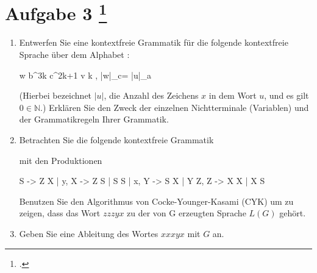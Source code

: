 \documentclass{lehramt-informatik-aufgabe}
\begin{document}
\let\m=\liMenge

\section{Aufgabe 3
\footcite{66115:2018:09}}

\begin{enumerate}


\item Entwerfen Sie eine kontextfreie Grammatik für die folgende
kontextfreie Sprache über dem Alphabet :

\begin{center}
\liAusdruck
  {w b^{3k} c^{2k+1} v}
  {k \in {}, |w|_c= |u|_a}
\end{center}

(Hierbei bezeichnet $|u|$, die Anzahl des Zeichens $x$ in dem Wort $u$,
und es gilt $0 \in \mathbb{N}$.) Erklären Sie den Zweck der einzelnen
Nichtterminale (Variablen) und der Grammatikregeln Ihrer Grammatik.


\item Betrachten Sie die folgende kontextfreie Grammatik

\begin{center}
\end{center}

mit den Produktionen

\begin{liProduktionsRegeln}
S -> Z X | y,
X -> Z S | S S | x,
Y -> S X | Y Z,
Z -> X X | X S
\end{liProduktionsRegeln}

Benutzen Sie den Algorithmus von Cocke-Younger-Kasami (CYK) um zu
zeigen, dass das Wort $zzzyx$ zu der von G erzeugten Sprache $L(G)$
gehört.


\item Geben Sie eine Ableitung des Wortes $xxxyx$ mit $G$ an.

\end{enumerate}
\end{document}
